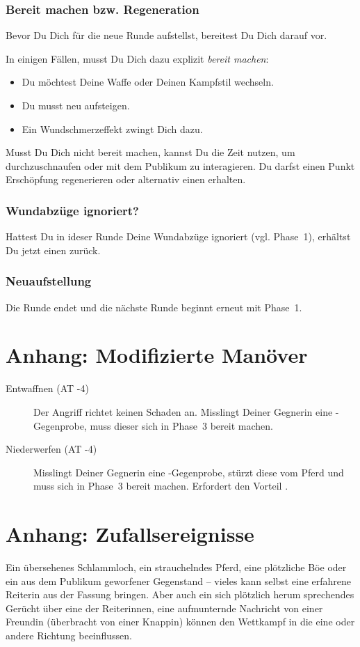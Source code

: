 \documentclass[12pt,div=calc,a5paper,parskip=half]{scrartcl}
\begin{document}
\subsubsection{Bereit machen bzw. Regeneration}
Bevor Du Dich für die neue Runde aufstellst, bereitest Du Dich darauf vor. 

In einigen Fällen, musst Du Dich dazu explizit \emph{bereit machen}: 
\begin{itemize}
    \item Du möchtest Deine Waffe oder Deinen Kampfstil wechseln. 
    \item Du musst neu aufsteigen. 
    \item Ein Wundschmerzeffekt zwingt Dich dazu.
\end{itemize}

Musst Du Dich nicht bereit machen, kannst Du die Zeit nutzen, um durchzuschnaufen oder mit dem Publikum zu interagieren. Du darfst einen Punkt Erschöpfung regenerieren oder alternativ einen \gp erhalten. 

\subsubsection{Wundabzüge ignoriert?}
Hattest Du in ideser Runde Deine Wundabzüge ignoriert (vgl. Phase~1), erhältst Du jetzt einen \gp zurück.

\subsubsection{Neuaufstellung}
Die Runde endet und die nächste Runde beginnt erneut mit Phase~1. 

\section{Anhang: Modifizierte Manöver}
\begin{description}
    \item[Entwaffnen (AT -4)] Der Angriff richtet keinen Schaden an. Misslingt Deiner Gegnerin eine -Gegenprobe, muss dieser sich in Phase~3 bereit machen. 
    \item[Niederwerfen (AT -4)] Misslingt Deiner Gegnerin eine -Gegenprobe, stürzt diese vom Pferd und muss sich in Phase~3 bereit machen. Erfordert den Vorteil . 
\end{description}

\section{Anhang: Zufallsereignisse}
Ein übersehenes Schlammloch, ein strauchelndes Pferd, eine plötzliche Böe oder ein aus dem Publikum geworfener Gegenstand -- vieles kann selbst eine erfahrene Reiterin aus der Fassung bringen. Aber auch ein sich plötzlich herum sprechendes Gerücht über eine der Reiterinnen, eine aufmunternde Nachricht von einer Freundin (überbracht von einer Knappin) können den Wettkampf in die eine oder andere Richtung beeinflussen. 
\end{document}
